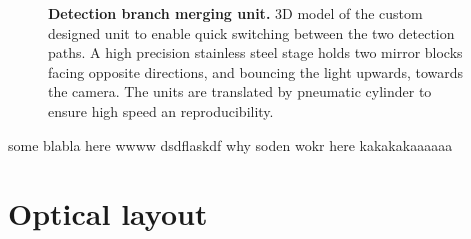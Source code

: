 \documentclass{diploma_style}
\begin{document}
\begin{figure}[htb]
\centering
\caption{\textbf{Detection branch merging unit.} 3D model of the custom designed unit to enable quick switching between the two detection paths. A high precision stainless steel stage holds two mirror blocks facing opposite directions, and bouncing the light upwards, towards the camera. The units are translated by  pneumatic cylinder to ensure high speed an reproducibility.}
\label{fig:DualMirror}
\end{figure}	

some blabla here wwww dsdflaskdf why soden wokr here kakakakaaaaaa

\section{Optical layout}
\end{document}
